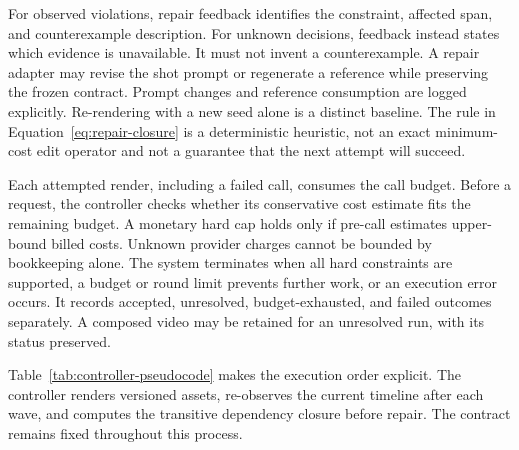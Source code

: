 For observed violations, repair feedback identifies the constraint, affected
span, and counterexample description. For unknown decisions, feedback instead
states which evidence is unavailable. It must not invent a counterexample.
A repair adapter may revise the shot prompt or regenerate a reference while
preserving the frozen contract. Prompt changes and reference consumption are
logged explicitly. Re-rendering with a new seed alone is a distinct baseline.
The rule in Equation~\ref{eq:repair-closure} is a deterministic heuristic,
not an exact minimum-cost edit operator and not a guarantee that the next
attempt will succeed.

Each attempted render, including a failed call, consumes the call budget.
Before a request, the controller checks whether its conservative cost
estimate fits the remaining budget. A monetary hard cap holds only if
pre-call estimates upper-bound billed costs. Unknown provider charges cannot
be bounded by bookkeeping alone. The system terminates when all hard
constraints are supported, a budget or round limit prevents further work,
or an execution error occurs. It records accepted, unresolved,
budget-exhausted, and failed outcomes separately. A composed video may be
retained for an unresolved run, with its status preserved.

Table~\ref{tab:controller-pseudocode} makes the execution order explicit.
The controller renders versioned assets, re-observes the current timeline after
each wave, and computes the transitive dependency closure before repair. The
contract remains fixed throughout this process.

